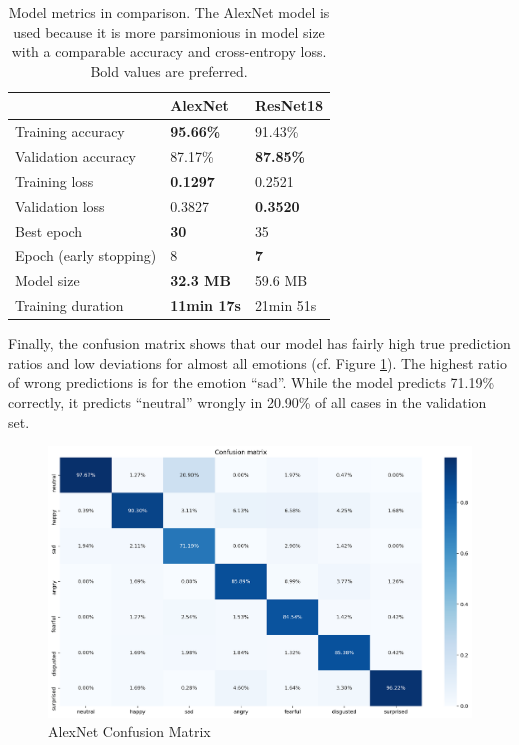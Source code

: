 \begin{table}
\setlength{\tabcolsep}{18pt}
\renewcommand{\arraystretch}{1.5}
\centering
\begin{tabular}{l|ll}
                       & AlexNet            & ResNet18         \\ \hline
Training accuracy      & \textbf{95.66\%}   & 91.43\%          \\
Validation accuracy    & 87.17\%            & \textbf{87.85\%} \\
Training loss          & \textbf{0.1297}    & 0.2521           \\
Validation loss        & 0.3827             & \textbf{0.3520}  \\
Best epoch             & \textbf{30}        & 35               \\
Epoch (early stopping) & 8                  & \textbf{7}       \\
Model size             & \textbf{32.3 MB}   & 59.6 MB          \\
Training duration      & \textbf{11min 17s} & 21min 51s        \\
\end{tabular}
\caption{Model metrics in comparison. The AlexNet model is used because it is more parsimonious in model size with a comparable accuracy and cross-entropy loss. Bold values are preferred.}
\label{tab:model_comparison}
\end{table}

Finally, the confusion matrix shows that our model has fairly high true prediction ratios and low deviations for almost all emotions (cf. Figure \ref{fig:alexnet_confusion_matrix}). The highest ratio of wrong predictions is for the emotion ``sad''. While the model predicts 71.19\% correctly, it predicts ``neutral'' wrongly in 20.90\% of all cases in the validation set.

\begin{figure}
\centering
\includegraphics[width=1\textwidth]{assets/alexnet_confusion_matrix.png}
\caption{AlexNet Confusion Matrix}
\label{fig:alexnet_confusion_matrix}
\end{figure}

